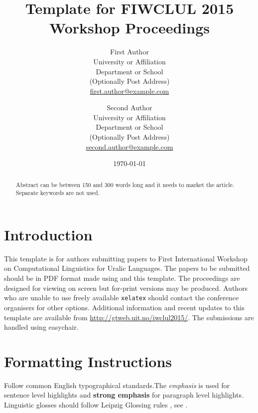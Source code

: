 \documentclass[b5paper]{article}
\begin{document}
\title{Template for FIWCLUL 2015 Workshop Proceedings}

\author{First Author\\
University or Affiliation\\
Department or School\\
(Optionally Post Address)\\
\url{first.author@example.com} \and
Second Author\\
University or Affiliation\\
Department or School\\
(Optionally Post Address)\\
\url{second.author@example.com} 
}

\date{\today}

\maketitle

\begin{abstract}
    Abstract can be between 150 and 300 words long and it needs to market
    the article. Separate keywords are not used.
\end{abstract}

\section{Introduction}

This template is for authors submitting papers to First International Workshop
on Computational Linguistics for Uralic Languages. The papers to be submitted
should be in PDF format made using \XeLaTeX{} and this template. The
proceedings are designed for viewing on screen but for-print versions may be
produced.  Authors who are unable to use freely available \texttt{xelatex}
should contact the conference organisers for other options. Additional
information and recent updates to this template are available from
\url{http://gtweb.uit.no/iwclul2015/}. The submissions are handled using
easychair.

\section{Formatting Instructions}

Follow common English typographical standards.The \emph{emphasis} is used for
sentence level highlights and \textbf{strong emphasis} for paragraph level
highlights. Linguistic glosses should follow Leipzig Glossing rules
\url{}, see \nextx.
\end{document}
